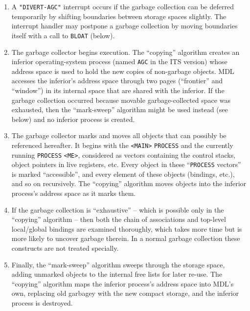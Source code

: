 \documentclass[a4paper,]{article}
\providecommand{\tightlist}{%
  \setlength{\itemsep}{0pt}\setlength{\parskip}{0pt}}
\begin{document}
\begin{enumerate}
\def\labelenumi{\arabic{enumi}.}
\tightlist
\item
  A \texttt{"DIVERT-AGC"}  interrupt occurs if the garbage collection can be deferred
  temporarily by shifting boundaries between storage spaces slightly. The interrupt handler may postpone a garbage
  collection by moving boundaries itself with a call to \texttt{BLOAT} (below).
\item
  The garbage collector begins execution. The ``copying'' algorithm creates an inferior operating-system process (named
  \texttt{AGC} in the ITS version) whose address space is used to hold the new copies of non-garbage
  objects. MDL accesses the inferior's address space through two pages (``frontier'' and ``window'') in its internal space
  that are shared with the inferior. If the garbage collection occurred because movable garbage-collected space was
  exhausted, then the ``mark-sweep'' algorithm might be used instead (see below) and no inferior process is created.
\item
  The garbage collector marks and moves all objects that can possibly be referenced hereafter. It begins with the
  \texttt{\textless{}MAIN\textgreater{}} \texttt{PROCESS} and the currently running \texttt{PROCESS}
  \texttt{\textless{}ME\textgreater{}}, considered as vectors containing the control stacks, object
  pointers in live registers, etc. Every object in these ``\texttt{PROCESS} vectors'' is marked ``accessible'', and every
  element of these objects (bindings, etc.), and so on recursively. The ``copying'' algorithm moves objects into the
  inferior process's address space as it marks them.
\item
  If the garbage collection is ``exhaustive'' -- which is possible only in the ``copying'' algorithm -- then both the chain
  of associations and top-level local/global bindings are examined thoroughly, which takes more time but is more likely to
  uncover garbage therein. In a normal garbage collection these constructs are not treated specially.
\item
  Finally, the ``mark-sweep'' algorithm sweeps through the storage space, adding unmarked objects to the internal free
  lists for later re-use. The ``copying'' algorithm maps the inferior process's address space into MDL's own, replacing old
  garbagey with the new compact storage, and the inferior process is destroyed.
\end{enumerate}
\end{document}
